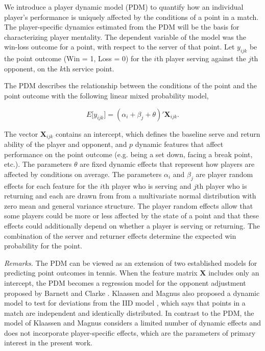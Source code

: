 \documentclass{Latex/svjour3}
\begin{document}
We introduce a player dynamic model (PDM) to quantify how an individual player's
performance is uniquely affected by the conditions of a point in a match. The
player-specific dynamics estimated from the PDM will be the basis for
characterizing player mentality. The dependent variable of the model was the
win-loss outcome for a point, with respect to the server of that point. Let
$y_{ijk}$ be the point outcome (Win = 1, Loss = 0) for the $i$th player serving
against the $j$th opponent, on the $k$th service point.

The PDM describes the relationship between the conditions of the point and the
point outcome with the following linear mixed probability model,

\begin{equation}
E\lbrack y_{ijk} \rbrack = (\alpha_{i} + \beta_{j} + \theta)' \mathbf{X}_{ijk}.
\label{eq:pdm}
\end{equation}

\noindent The vector $\mathbf{X}_{ijk}$ contains an intercept, which defines the
baseline serve and return ability of the player and opponent, and $p$ dynamic
features that affect performance on the point outcome (e.g. being a set down,
facing a break point, etc.). The parameters $\theta$ are fixed dynamic effects
that represent how players are affected by conditions   on average. The parameters
$\alpha_i$ and $\beta_j$ are player random effects for each feature for the
$i$th player who is serving and $j$th player who is returning and each are drawn
from from a multivariate normal distribution with zero mean and general variance
structure. The player random effects allow that some players could be more or
less affected by the state of a point and that these effects could additionally
depend on whether a player is serving or returning. The combination of the
server and returner effects determine the expected win probability for the
point.

\textit{Remarks.} The PDM can be viewed as an extension of two established
models for predicting point outcomes in tennis. When the feature matrix
$\mathbf{X}$ includes only an intercept, the PDM becomes a regression model for
the opponent adjustment proposed by Barnett and Clarke . Klaassen and Magnus also proposed a dynamic
model to test for deviations from the IID model , which says that points in a match are independent
and identically distributed. In contrast to the PDM, the model of Klaassen and
Magnus considers a limited number of dynamic effects and does not incorporate
player-specific effects, which are the parameters of primary interest in the
present work.
\end{document}
